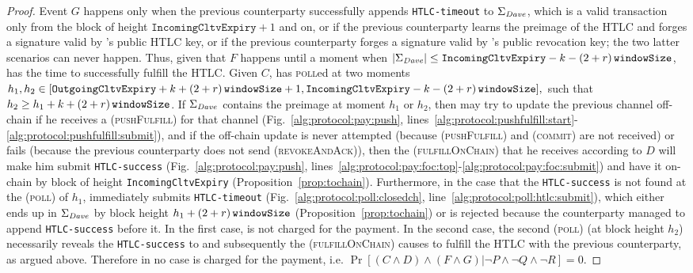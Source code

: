 \begin{proof}
  Event $G$ happens only when the previous counterparty successfully appends
  \texttt{HTLC-timeout} to $\Sigma_{\mathit{Dave}}$, which is a valid transaction only
  from the block of height $\mathtt{IncomingCltvExpiry} + 1$ and on, or if the
  previous counterparty learns the preimage of the HTLC and forges a signature
  valid by \dave's public HTLC key, or if the previous counterparty forges a
  signature valid by \dave's public revocation key; the two latter scenarios can
  never happen. Thus, given that $F$ happens until a moment when
  $|\Sigma_{\mathit{Dave}}| \leq \mathtt{IncomingCltvExpiry} - k - \left(2 + r\right)\texttt{windowSize}{}$, \dave{}
  has the time to successfully fulfill the HTLC. Given $C$, \dave{} has
  \textsc{poll}ed at two moments $h_1, h_2 \in [\mathtt{OutgoingCltvExpiry} + k
  + \left(2 + r\right)\texttt{windowSize}{} + 1, \mathtt{IncomingCltvExpiry} - k - \left(2 + r\right)\texttt{windowSize}{}],$ such that
  $h_2 \geq h_1 + k + \left(2 + r\right)\texttt{windowSize}{}$. If $\Sigma_{\mathit{Dave}}$ contains the preimage at
  moment $h_1$ or $h_2$, then \dave{} may try to update the previous channel
  off-chain if he receives a (\textsc{pushFulfill}) for that channel
  (Fig.~\ref{alg:protocol:pay:push},
  lines~\ref{alg:protocol:pushfulfill:start}-\ref{alg:protocol:pushfulfill:submit}),
  and if the off-chain update is never attempted (because (\textsc{pushFulfill})
  and (\textsc{commit}) are not received) or fails (because the previous
  counterparty does not send (\textsc{revokeAndAck})), then the
  (\textsc{fulfillOnChain}) that he receives according to $D$ will make him
  submit \texttt{HTLC-success} (Fig.~\ref{alg:protocol:pay:push},
  lines~\ref{alg:protocol:pay:foc:top}-\ref{alg:protocol:pay:foc:submit}) and
  have it on-chain by block of height \texttt{IncomingCltvExpiry}
  (Proposition~\ref{prop:tochain}). Furthermore, in the case that the
  \texttt{HTLC-success} is not found at the (\textsc{poll}) of $h_1$, \dave{}
  immediately submits \texttt{HTLC-timeout}
  (Fig.~\ref{alg:protocol:poll:closedch},
  line~\ref{alg:protocol:poll:htlc:submit}), which either ends up in
  $\Sigma_{\mathit{Dave}}$ by block height $h_1 + \left(2 + r\right)\texttt{windowSize}{}$
  (Proposition~\ref{prop:tochain}) or is rejected because the counterparty
  managed to append \texttt{HTLC-success} before it. In the first case, \dave{}
  is not charged for the payment. In the second case, the second (\textsc{poll})
  (at block height $h_2$) necessarily reveals the \texttt{HTLC-success} to
  \dave{} and subsequently the (\textsc{fulfillOnChain}) causes \dave{} to
  fulfill the HTLC with the previous counterparty, as argued above. Therefore in
  no case \dave{} is charged for the payment, i.e. $\Pr[(C \wedge D) \wedge (F
  \wedge G) | \neg P \wedge \neg Q \wedge \neg R] = 0$.


\end{proof}
